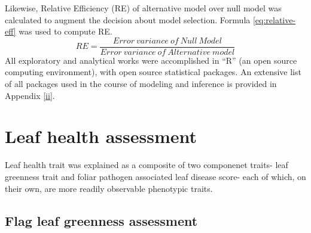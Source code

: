 \documentclass[12pt,oneside]{dukestatscithesis} %
\begin{document}
Likewise, Relative Efficiency (RE) of alternative model over null model was calculated to augment the decision about model selection. Formula \eqref{eq:relative-eff} was used to compute RE.
\begin{equation}
RE = \frac{Error\ variance\ of\ Null\ Model}{Error\ variance\ of\ Alternative\ model}
\label{eq:relative-eff}
\end{equation}
All exploratory and analytical works were accomplished in ``R'' (an open source computing environment), with open source statistical packages. An extensive list of all packages used in the course of modeling and inference is provided in Appendix \ref{ii}.

\hypertarget{leaf-health}{%
\section{Leaf health assessment}\label{leaf-health}}

Leaf health trait was explained as a composite of two componenet traits- leaf greenness trait and foliar pathogen associated leaf disease score- each of which, on their own, are more readily observable phenotypic traits.

\hypertarget{greenness}{%
\subsection{Flag leaf greenness assessment}\label{greenness}}
\end{document}
